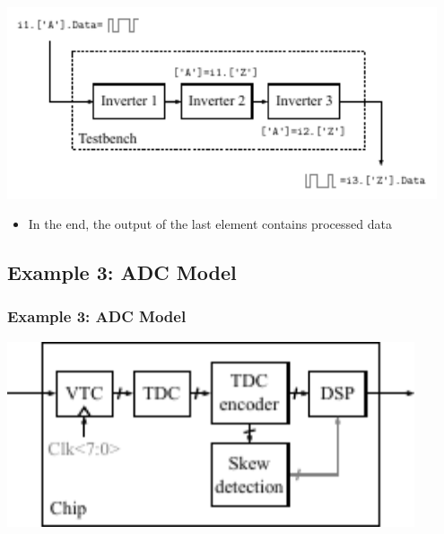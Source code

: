 \documentclass{sdkslides}
\begin{document}
\begin{frame}[t]
    \frametitle{\sectionname}
    \begin{center}
        \includegraphics[width=0.95\textwidth]{Pics/inverter_chain_5}
    \end{center}
    \begin{itemize}
        \item In the end, the output of the last element contains processed data
    \end{itemize}
\end{frame}


\renewcommand{\sectionname}{Example 3: ADC Model}
\subsection*{\sectionname} 
\begin{frame}[c]
    \frametitle{\sectionname}
    \begin{center}
        \includegraphics[width=0.9\textwidth]{Pics/sdk_model_0}
    \end{center}
\end{frame}
\end{document}
